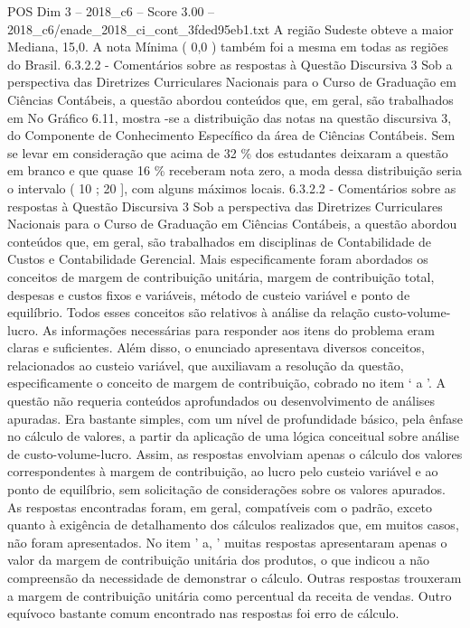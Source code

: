 \begin{textsample}{POS Dim 3 – 2018\_c6 – Score 3.00 – 2018\_c6/enade\_2018\_ci\_cont\_3fded95eb1.txt}
A região Sudeste obteve a maior Mediana, 15,0.
A nota Mínima ( 0,0 ) também foi a mesma em todas as regiões do Brasil. 6.3.2.2 - Comentários sobre as respostas à Questão Discursiva 3 Sob a perspectiva das Diretrizes Curriculares Nacionais para o Curso de Graduação em Ciências Contábeis, a questão abordou conteúdos que, em geral, são trabalhados em No Gráfico 6.11, mostra -se a distribuição das notas na questão discursiva 3, do Componente de Conhecimento Específico da área de Ciências Contábeis.
Sem se levar em consideração que acima de 32 \% dos estudantes deixaram a questão em branco e que quase 16 \% receberam nota zero, a moda dessa distribuição seria o intervalo ( 10 ; 20 ], com alguns máximos locais. 6.3.2.2 - Comentários sobre as respostas à Questão Discursiva 3 Sob a perspectiva das Diretrizes Curriculares Nacionais para o Curso de Graduação em Ciências Contábeis, a questão abordou conteúdos que, em geral, são trabalhados em disciplinas de Contabilidade de Custos e Contabilidade Gerencial.
Mais especificamente foram abordados os conceitos de margem de contribuição unitária, margem de contribuição total, despesas e custos fixos e variáveis, método de custeio variável e ponto de equilíbrio.
Todos esses conceitos são relativos à análise da relação custo-volume-lucro.
As informações necessárias para responder aos itens do problema eram claras e suficientes.
Além disso, o enunciado apresentava diversos conceitos, relacionados ao custeio variável, que auxiliavam a resolução da questão, especificamente o conceito de margem de contribuição, cobrado no item ‘ a ’.
A questão não requeria conteúdos aprofundados ou desenvolvimento de análises apuradas.
Era bastante simples, com um nível de profundidade básico, pela ênfase no cálculo de valores, a partir da aplicação de uma lógica conceitual sobre análise de custo-volume-lucro.
Assim, as respostas envolviam apenas o cálculo dos valores correspondentes à margem de contribuição, ao lucro pelo custeio variável e ao ponto de equilíbrio, sem solicitação de considerações sobre os valores apurados.
As respostas encontradas foram, em geral, compatíveis com o padrão, exceto quanto à exigência de detalhamento dos cálculos realizados que, em muitos casos, não foram apresentados.
No item ' a, ' muitas respostas apresentaram apenas o valor da margem de contribuição unitária dos produtos, o que indicou a não compreensão da necessidade de demonstrar o cálculo.
Outras respostas trouxeram a margem de contribuição unitária como percentual da receita de vendas.
Outro equívoco bastante comum encontrado nas respostas foi erro de cálculo.

\end{textsample}
